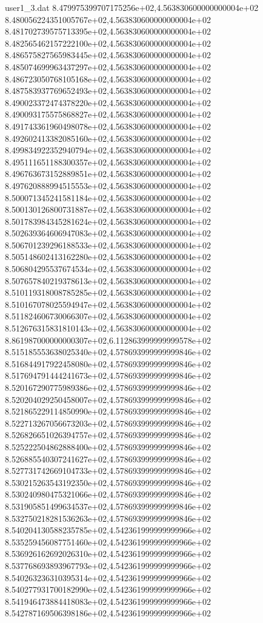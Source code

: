 \begin{filecontents}{user1_3.dat}
8.479975399707175256e+02,4.563830600000000004e+02
8.480056224351005767e+02,4.563830600000000004e+02
8.481702739575713395e+02,4.563830600000000004e+02
8.482565462157222100e+02,4.563830600000000004e+02
8.486575827565983445e+02,4.563830600000000004e+02
8.485074699963437297e+02,4.563830600000000004e+02
8.486723050768105168e+02,4.563830600000000004e+02
8.487583937769652493e+02,4.563830600000000004e+02
8.490023372474378220e+02,4.563830600000000004e+02
8.490093175575868827e+02,4.563830600000000004e+02
8.491743361960498078e+02,4.563830600000000004e+02
8.492602413382085160e+02,4.563830600000000004e+02
8.499834922352940794e+02,4.563830600000000004e+02
8.495111651188300357e+02,4.563830600000000004e+02
8.496763673152889851e+02,4.563830600000000004e+02
8.497620888994515553e+02,4.563830600000000004e+02
8.500071345241581184e+02,4.563830600000000004e+02
8.500130126800731887e+02,4.563830600000000004e+02
8.501783984345281624e+02,4.563830600000000004e+02
8.502639364606947083e+02,4.563830600000000004e+02
8.506701239296188533e+02,4.563830600000000004e+02
8.505148602413162280e+02,4.563830600000000004e+02
8.506804295537674534e+02,4.563830600000000004e+02
8.507657840219378613e+02,4.563830600000000004e+02
8.510119318008785285e+02,4.563830600000000004e+02
8.510167078025594947e+02,4.563830600000000004e+02
8.511824606730066307e+02,4.563830600000000004e+02
8.512676315831810143e+02,4.563830600000000004e+02
8.861987000000000307e+02,6.112863999999999578e+02
8.515185553638025340e+02,4.578693999999999846e+02
8.516844917922458080e+02,4.578693999999999846e+02
8.517694791444241673e+02,4.578693999999999846e+02
8.520167290775989386e+02,4.578693999999999846e+02
8.520204029250458007e+02,4.578693999999999846e+02
8.521865229114850990e+02,4.578693999999999846e+02
8.522713267056673203e+02,4.578693999999999846e+02
8.526826651026394757e+02,4.578693999999999846e+02
8.525222504862888400e+02,4.578693999999999846e+02
8.526885540307241627e+02,4.578693999999999846e+02
8.527731742669104733e+02,4.578693999999999846e+02
8.530215263543192350e+02,4.578693999999999846e+02
8.530240980475321066e+02,4.578693999999999846e+02
8.531905851499634537e+02,4.578693999999999846e+02
8.532750218281536263e+02,4.578693999999999846e+02
8.540204130588235785e+02,4.542361999999999966e+02
8.535259456087751460e+02,4.542361999999999966e+02
8.536926162692026310e+02,4.542361999999999966e+02
8.537768693893967793e+02,4.542361999999999966e+02
8.540263236310395314e+02,4.542361999999999966e+02
8.540277931700182990e+02,4.542361999999999966e+02
8.541946473884418083e+02,4.542361999999999966e+02
8.542787169506398186e+02,4.542361999999999966e+02

\end{filecontents}
